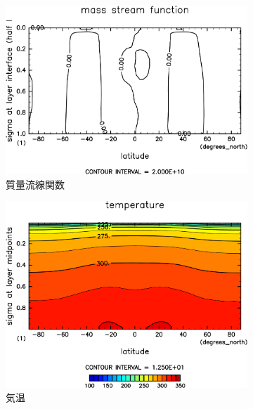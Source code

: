 \documentclass[body]{subfiles}
\begin{document}
\begin{figure}[t]
\begin{subfigure}{.4\textwidth}
		\centering
		\includegraphics[width=\columnwidth]{S2000/MSF,time=7300:7665-crop-rotate.pdf}
		\caption{質量流線関数\hmu*{[kg/s]}}\label{S2000質量流線関数}
	\end{subfigure}
	\begin{subfigure}{.4\textwidth}
		\centering
		\includegraphics[width=\columnwidth]{S2000/Temp,time=7300:7665-crop-rotate.pdf}
		\caption{気温\hmu*{[K]}}\label{S2000気温分布}
	\end{subfigure}
	\begin{subfigure}{.4\textwidth}
		\centering

\end{subfigure}
\end{figure}
\end{document}
